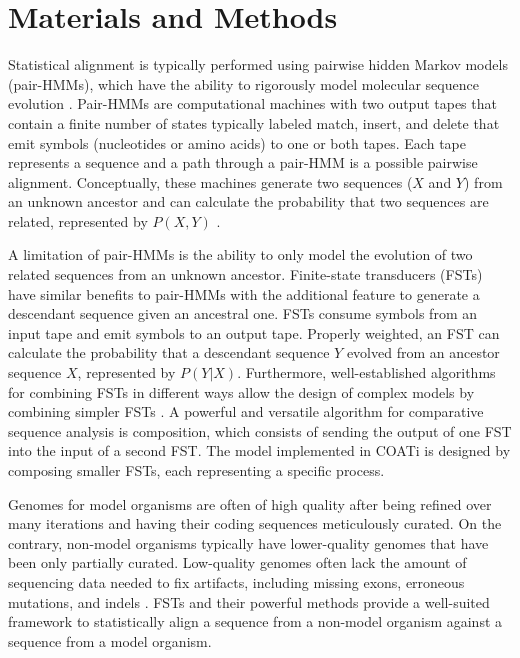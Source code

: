 \section*{Materials and Methods}  %

Statistical alignment is typically performed using pairwise hidden Markov models (pair-HMMs), which have the ability to rigorously model molecular sequence evolution \parencite{bradley2007transducers}.
Pair-HMMs are computational machines with two output tapes that contain a finite number of states typically labeled match, insert, and delete that emit symbols (nucleotides or amino acids) to one or both tapes.
Each tape represents a sequence and a path through a pair-HMM is a possible pairwise alignment.
Conceptually, these machines generate two sequences ($X$ and $Y$) from an unknown ancestor and can calculate the probability that two sequences are related, represented by $P(X, Y)$ \parencite{yoon_2009_hmm}.

A limitation of pair-HMMs is the ability to only model the evolution of two related sequences from an unknown ancestor.
Finite-state transducers (FSTs) have similar benefits to pair-HMMs with the additional feature to generate a descendant sequence given an ancestral one.
FSTs consume symbols from an input tape and emit symbols to an output tape.
Properly weighted, an FST can calculate the probability that a descendant sequence $Y$ evolved from an ancestor sequence $X$, represented by $P(Y | X)$.
Furthermore, well-established algorithms for combining FSTs in different ways allow the design of complex models by combining simpler FSTs \parencite{bradley2007transducers}.
A powerful and versatile algorithm for comparative sequence analysis is composition, which consists of sending the output of one FST into the input of a second FST.
The model implemented in COATi is designed by composing smaller FSTs, each representing a specific process.

Genomes for model organisms are often of high quality after being refined over many iterations and having their coding sequences meticulously curated.
On the contrary, non-model organisms typically have lower-quality genomes that have been only partially curated.
Low-quality genomes often lack the amount of sequencing data needed to fix artifacts, including missing exons, erroneous mutations, and indels \parencite{jackman2018tigmint}.
FSTs and their powerful methods provide a well-suited framework to statistically align a sequence from a non-model organism against a sequence from a model organism.

